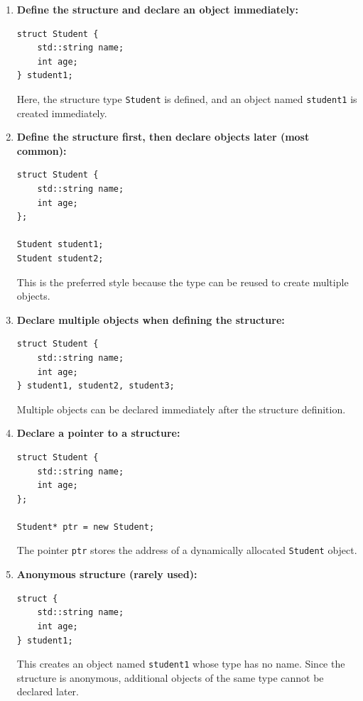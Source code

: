\documentclass[10pt]{article}
\begin{document}
\begin{enumerate}
    \item \textbf{Define the structure and declare an object immediately:}

\begin{verbatim}
struct Student {
    std::string name;
    int age;
} student1;
\end{verbatim}

    Here, the structure type \verb|Student| is defined, and an object named
    \verb|student1| is created immediately.

    \item \textbf{Define the structure first, then declare objects later (most common):}

\begin{verbatim}
struct Student {
    std::string name;
    int age;
};

Student student1;
Student student2;
\end{verbatim}

    This is the preferred style because the type can be reused to create
    multiple objects.

    \item \textbf{Declare multiple objects when defining the structure:}

\begin{verbatim}
struct Student {
    std::string name;
    int age;
} student1, student2, student3;
\end{verbatim}

    Multiple objects can be declared immediately after the structure
    definition.

    \item \textbf{Declare a pointer to a structure:}

\begin{verbatim}
struct Student {
    std::string name;
    int age;
};

Student* ptr = new Student;
\end{verbatim}

    The pointer \verb|ptr| stores the address of a dynamically allocated
    \verb|Student| object.

    \item \textbf{Anonymous structure (rarely used):}

\begin{verbatim}
struct {
    std::string name;
    int age;
} student1;
\end{verbatim}

    This creates an object named \verb|student1| whose type has no name.
    Since the structure is anonymous, additional objects of the same type
    cannot be declared later.
\end{enumerate}
\end{document}
